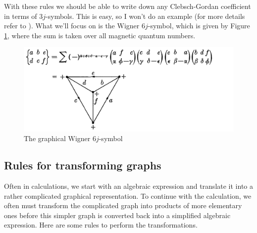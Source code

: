 \documentclass[11pt]{article}
\begin{document}
\begin{appendices}
With these rules we should be able to write down any  Clebsch-Gordan coefficient in terms of $3j$-symbols. This is easy, so I won't do an example (for more details refer to \cite{angular_momentum}). What we'll focus on is the Wigner $6j$-symbol, which is given by Figure \ref{fig:6j}, where the sum is taken over all magnetic quantum numbers. 
\begin{figure}[!htb]
	\centering
	\includegraphics[scale=0.7]{j6_graph}
	\caption{The graphical Wigner $6j$-symbol \cite{angular_momentum}}
	\label{fig:6j}
\end{figure}


\subsection{Rules for transforming graphs}
Often in calculations, we start with an algebraic expression and translate it into a rather complicated graphical representation. To continue with the calculation, we often must transform the complicated graph into products of more elementary ones before this simpler graph is converted back into a simplified algebraic expression. Here are some rules to perform the transformations. 


\end{appendices}
\end{document}

